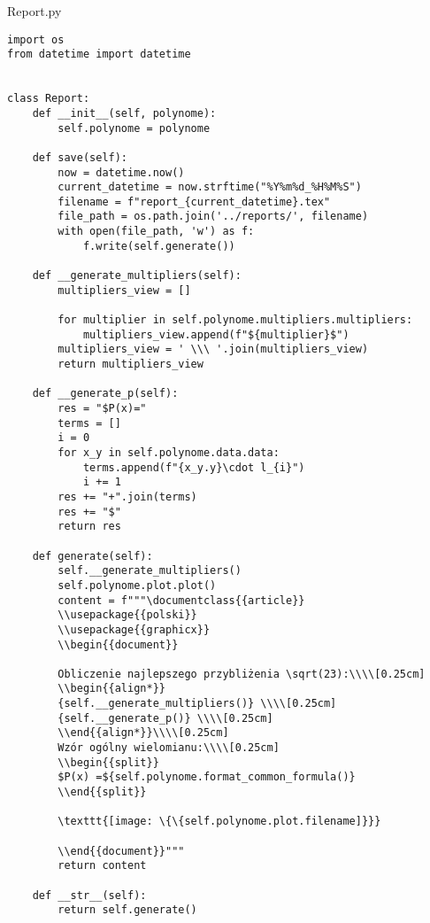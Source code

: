 \documentclass[12pt]{article}
\begin{document}
Report.py
\begin{lstlisting}[frame=single]
import os
from datetime import datetime


class Report:
    def __init__(self, polynome):
        self.polynome = polynome

    def save(self):
        now = datetime.now()
        current_datetime = now.strftime("%Y%m%d_%H%M%S")
        filename = f"report_{current_datetime}.tex"
        file_path = os.path.join('../reports/', filename)
        with open(file_path, 'w') as f:
            f.write(self.generate())

    def __generate_multipliers(self):
        multipliers_view = []

        for multiplier in self.polynome.multipliers.multipliers:
            multipliers_view.append(f"${multiplier}$")
        multipliers_view = ' \\\ '.join(multipliers_view)
        return multipliers_view

    def __generate_p(self):
        res = "$P(x)="
        terms = []
        i = 0
        for x_y in self.polynome.data.data:
            terms.append(f"{x_y.y}\cdot l_{i}")
            i += 1
        res += "+".join(terms)
        res += "$"
        return res

    def generate(self):
        self.__generate_multipliers()
        self.polynome.plot.plot()
        content = f"""\documentclass{{article}}
        \\usepackage{{polski}}
        \\usepackage{{graphicx}}
        \\begin{{document}}
        
        Obliczenie najlepszego przybliżenia \sqrt(23):\\\\[0.25cm]
        \\begin{{align*}}
        {self.__generate_multipliers()} \\\\[0.25cm]
        {self.__generate_p()} \\\\[0.25cm]
        \\end{{align*}}\\\\[0.25cm]
        Wzór ogólny wielomianu:\\\\[0.25cm]
        \\begin{{split}}
        $P(x) =${self.polynome.format_common_formula()}
        \\end{{split}}
        
        \texttt{[image: \{\{self.polynome.plot.filename]}}}
        
        \\end{{document}}"""
        return content

    def __str__(self):
        return self.generate()
\end{lstlisting}
\end{document}
